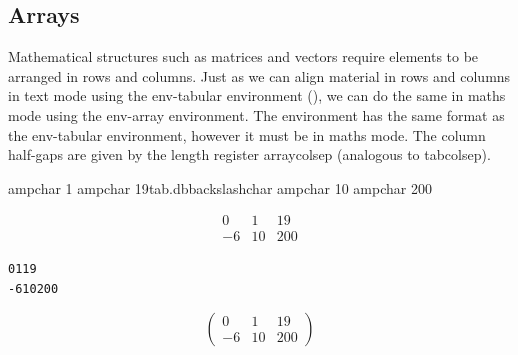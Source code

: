 
\subsection{Arrays}
\label{sec:arrays}

Mathematical structures such as matrices and vectors require elements
to be arranged in rows and columns.  Just as we can align material in
rows and columns in text mode using the
\gls{env-tabular} environment (), we can do the
same in maths mode using the \gls{env-array} environment.  The
 environment has the same format as the
\gls{env-tabular} environment, however it must be in maths mode.
The column half-gaps are given by the \gls{length} register
\gls{arraycolsep} (analogous to \gls{tabcolsep}). 


\begin{code}
\newline
{} \gls{ampchar} 1 \gls{ampchar} 19\gls{tab.dbbackslashchar} \gls{ampchar} 10 \gls{ampchar} 200\newline
{}\newline
{}
\end{code}

\begin{result}
\[
\begin{array}{rrr}
0 & 1 & 19\\
-6 & 10 & 200
\end{array}
\]
\end{result}


\begin{code}
\begin{alltt}
   0  1  19
  -6  10  200
\end{alltt}
\end{code}%
\begin{resultS}
\[
\left(
\begin{array}{rrr}
0 & 1 & 19\\
-6 & 10 & 200
\end{array}
\right)
\]
\end{resultS}

